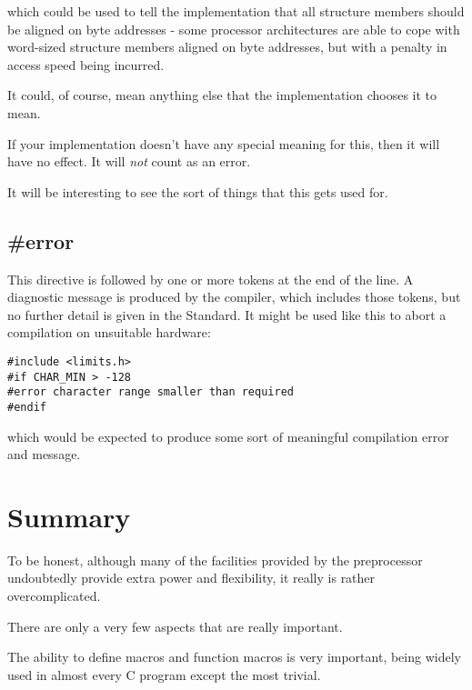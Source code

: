    which could be used to tell the implementation that all structure
    members should be aligned on byte addresses - some processor
    architectures are able to cope with word-sized structure members aligned
    on byte addresses, but with a penalty in access speed being
    incurred.


   It could, of course, mean anything else that the implementation
    chooses it to mean.


   If your implementation doesn't have any special meaning for this, then
    it will have no effect. It will \textit{not} count as an error.


   It will be interesting to see the sort of things that this gets used
    for.


  

  \subsection{\#error}
   

   This directive is followed by one or more tokens at the end of the
    line. A diagnostic message is produced by the compiler, which includes
    those tokens, but no further detail is given in the Standard. It might
    be used like this to abort a compilation on unsuitable hardware:


   \begin{Verbatim}
#include <limits.h>
#if CHAR_MIN > -128
#error character range smaller than required
#endif
\end{Verbatim}

   which would be expected to produce some sort of meaningful compilation
    error and message.


  

 
        \section{Summary}
        


  To be honest, although many of the facilities provided by the
   preprocessor undoubtedly provide extra power and flexibility, it
   really is rather overcomplicated.


  There are only a very few aspects that are really important.


  The ability to define macros and function macros is very important,
   being widely used in almost every C program except the most trivial.


